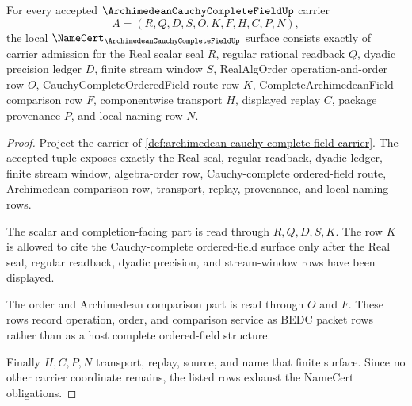 \begin{theorem}
\label{thm:archimedean-cauchy-complete-field-namecert-obligations}
For every accepted $\ArchimedeanCauchyCompleteFieldUp$ carrier
$$
A=(R,Q,D,S,O,K,F,H,C,P,N),
$$
the local $\NameCert_{\ArchimedeanCauchyCompleteFieldUp}$ surface consists exactly of carrier admission for the Real scalar seal $R$, regular rational readback $Q$, dyadic precision ledger $D$, finite stream window $S$, RealAlgOrder operation-and-order row $O$, CauchyCompleteOrderedField route row $K$, CompleteArchimedeanField comparison row $F$, componentwise transport $H$, displayed replay $C$, package provenance $P$, and local naming row $N$.
\end{theorem}
\begin{proof}
Project the carrier of \autoref{def:archimedean-cauchy-complete-field-carrier}. The accepted tuple exposes exactly the Real seal, regular readback, dyadic ledger, finite stream window, algebra-order row, Cauchy-complete ordered-field route, Archimedean comparison row, transport, replay, provenance, and local naming rows.

The scalar and completion-facing part is read through $R,Q,D,S,K$. The row $K$ is allowed to cite the Cauchy-complete ordered-field surface only after the Real seal, regular readback, dyadic precision, and stream-window rows have been displayed.

The order and Archimedean comparison part is read through $O$ and $F$. These rows record operation, order, and comparison service as BEDC packet rows rather than as a host complete ordered-field structure.

Finally $H,C,P,N$ transport, replay, source, and name that finite surface. Since no other carrier coordinate remains, the listed rows exhaust the NameCert obligations.
\end{proof}

